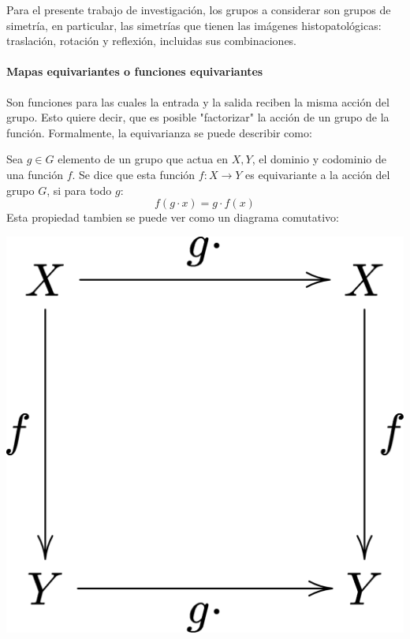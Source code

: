 \documentclass[12pt,letterpaper,final, openany]{scrbook}
\begin{document}
Para el presente trabajo de investigación, los grupos a considerar son grupos de simetría, en particular, las simetrías que tienen las imágenes histopatológicas: traslación, rotación y reflexión, incluidas sus combinaciones. 


\paragraph{Mapas equivariantes o funciones equivariantes}

Son funciones para las cuales la entrada y la salida reciben la misma acción del grupo. Esto quiere decir, que es posible "factorizar" la acción de un grupo de la función. Formalmente, la equivarianza se puede describir como:

Sea $g \in G$ elemento de un grupo que actua en $X,Y$, el dominio y codominio de una función $f$. Se dice que esta función $f \colon  X \to Y $ es equivariante a la acción del grupo $G$, si para todo $g$:
\begin{equation}
f(g \cdot x)=g \cdot f(x)
\end{equation}
Esta propiedad tambien se puede ver como un diagrama comutativo:
\begin{center}
\includegraphics[scale=0.1]{equivariance_diagram.png}
\end{center}
\end{document}
